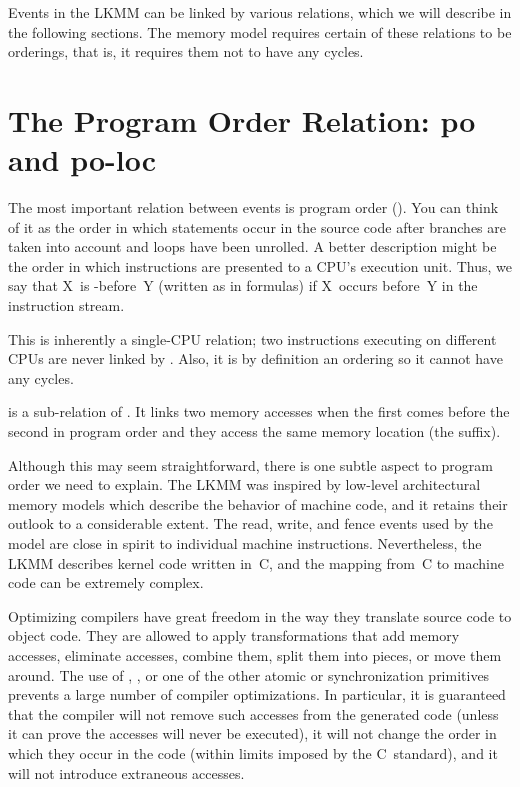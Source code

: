 Events in the LKMM can be linked by various relations, which we will
describe in the following sections.
The memory model requires certain of these relations to be orderings,
that is, it requires them not to have any cycles.


\section{The Program Order Relation: po and po-loc}
\label{sec:docs:explanation:The Program Order Relation: po and po-loc}

The most important relation between events is program order ().
You can think of it as the order in which statements occur in the source
code after branches are taken into account and loops have been
unrolled.
A better description might be the order in which instructions are
presented to a CPU's execution unit.
Thus, we say that X~is -before~Y (written as  in
formulas) if X~occurs before~Y in the instruction stream.

This is inherently a single-CPU relation; two instructions executing
on different CPUs are never linked by .
Also, it is by definition an ordering so it cannot have any cycles.

 is a sub-relation of .
It links two memory accesses when the first comes before the second
in program order and they access the same memory location (the 
suffix).

Although this may seem straightforward, there is one subtle aspect to
program order we need to explain.
The LKMM was inspired by low-level architectural memory models which
describe the behavior of machine code, and it retains their outlook
to a considerable extent.
The read, write, and fence events used by the model are close in spirit
to individual machine instructions.
Nevertheless, the LKMM describes kernel code written in~C, and the
mapping from~C to machine code can be extremely complex.

Optimizing compilers have great freedom in the way they translate
source code to object code.
They are allowed to apply transformations that add memory accesses,
eliminate accesses, combine them, split them into pieces, or move them
around.
The use of , , or one of the other
atomic or synchronization primitives prevents a large number of
compiler optimizations.
In particular, it is guaranteed that the compiler will not remove such
accesses from the generated code (unless it can prove the accesses will
never be executed), it will not change the order in which they occur
in the code (within limits imposed by the C~standard), and it will not
introduce extraneous accesses.

